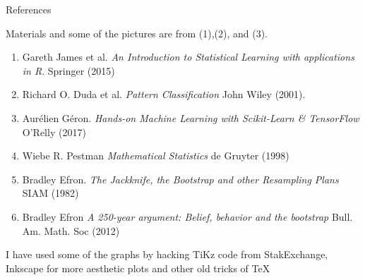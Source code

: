 \documentclass{beamer}
\begin{document}
	\begin{frame}{References}
		
		Materials and some of the pictures are from (1),(2), and (3).
		\begin{enumerate}
			\item Gareth James et al. {\it An Introduction to Statistical Learning with applications in R}. Springer (2015)
			\item Richard O. Duda et al. {\it Pattern Classification} John Wiley (2001). 
			\item Aur\'elien G\'eron. {\it Hands-on Machine Learning with Scikit-Learn \& TensorFlow} O'Relly (2017)
			\item Wiebe R. Pestman {\it Mathematical Statistics} de Gruyter (1998)
			\item Bradley Efron. {\it The Jackknife, the Bootstrap and other Resampling Plans}  SIAM (1982)
			\item Bradley Efron {\it A 250-year argument: Belief, behavior and the bootstrap} Bull. Am. Math. Soc (2012)
		\end{enumerate}	
		
		I have used some of the graphs by hacking TiKz code from StakExchange, Inkscape for more aesthetic plots and other old tricks of \TeX
	\end{frame}	

	
\end{document}
